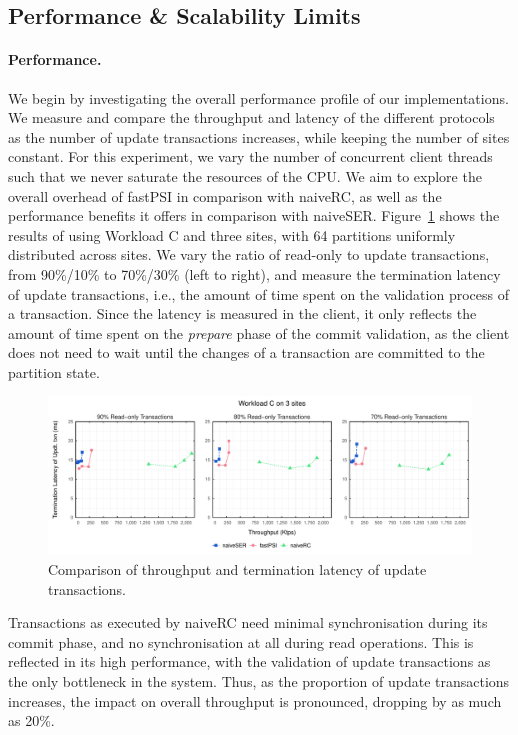 \subsection{Performance \& Scalability Limits}

\paragraph{Performance.} We begin by investigating the overall performance profile of our implementations. We measure and compare the throughput and latency of the different protocols as the number of update transactions increases, while keeping the number of sites constant. For this experiment, we vary the number of concurrent client threads such that we never saturate the resources of the CPU. We aim to explore the overall overhead of fastPSI in comparison with naiveRC, as well as the performance benefits it offers in comparison with naiveSER. Figure~\ref{fig:general_bench} shows the results of using Workload C and three sites, with 64 partitions uniformly distributed across sites. We vary the ratio of read-only to update transactions, from 90\%/10\% to 70\%/30\% (left to right), and measure the termination latency of update transactions, i.e., the amount of time spent on the validation process of a transaction. Since the latency is measured in the client, it only reflects the amount of time spent on the \emph{prepare} phase of the commit validation, as the client does not need to wait until the changes of a transaction are committed to the partition state.

\begin{figure}[t]
\vspace{-0.5cm}
\includegraphics[width=\textwidth]{figures/general_bench.pdf}
\vspace{-1cm}
\caption{Comparison of throughput and termination latency of update transactions.}
\label{fig:general_bench}
\end{figure}

Transactions as executed by naiveRC need minimal synchronisation during its commit phase, and no synchronisation at all during read operations. This is reflected in its high performance, with the validation of update transactions as the only bottleneck in the system. Thus, as the proportion of update transactions increases, the impact on overall throughput is pronounced, dropping by as much as 20\%.

